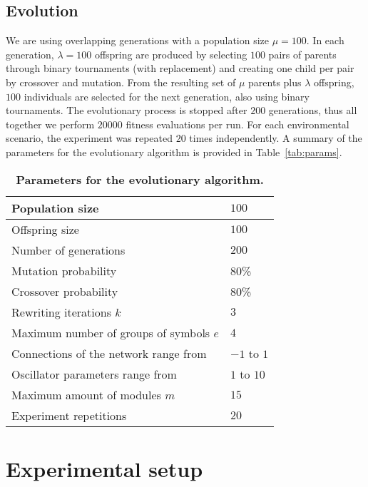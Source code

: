 \documentclass[utf8]{frontiersSCNS} %
\begin{document}
   
\subsection{Evolution}
\label{sec:evolution}
   We are using overlapping generations with a population size $\mu=100$. In each generation, $\lambda=100$ offspring are produced by selecting $100$ pairs of parents through binary tournaments (with replacement) and creating one child per pair by crossover and mutation. From the resulting set of $\mu$ parents plus $\lambda$ offspring, $100$ individuals are selected for the next generation, also using binary tournaments. The evolutionary process is stopped after $200$ generations, thus all together we perform $20000$ fitness evaluations per run. For each environmental scenario, the experiment was repeated $20$ times independently. A summary of the parameters for the evolutionary algorithm is provided in Table~\ref{tab:params}.

 \begin{table}[!ht]
 
\centering
\caption{  
{\bf Parameters for the evolutionary algorithm.}}
\begin{tabular}{|l|l|}
  \hline

  Population size & $100$  \\ \hline
   Offspring size & $100$  \\ \hline
  Number of generations & $200$  \\ \hline
    Mutation probability & $80$\%  \\ \hline
  Crossover probability & $80$\%  \\ \hline
   Rewriting iterations $k$  & $3$  \\ \hline
  Maximum number of groups of symbols $e$ & $4$  \\ \hline
   Connections of the network range from & $-1$ to $1$  \\ \hline
   Oscillator parameters range from & $1$ to $10$  \\ \hline
  Maximum amount of modules $m$ & $15$  \\ \hline
  Experiment repetitions & $20$  \\ \hline
   
 
\end{tabular}

\label{tab:params}
\label{table2}
 
\end{table}

 
 \section{Experimental setup}  
\end{document}
